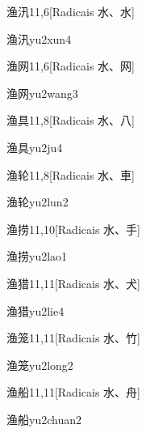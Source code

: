 \begin{entry}{渔汛}{11,6}[Radicais ⽔、⽔]
  \begin{phonetics}{渔汛}{yu2xun4}
  \end{phonetics}
\end{entry}

\begin{entry}{渔网}{11,6}[Radicais ⽔、⽹]
  \begin{phonetics}{渔网}{yu2wang3}
  \end{phonetics}
\end{entry}

\begin{entry}{渔具}{11,8}[Radicais ⽔、⼋]
  \begin{phonetics}{渔具}{yu2ju4}
  \end{phonetics}
\end{entry}

\begin{entry}{渔轮}{11,8}[Radicais ⽔、⾞]
  \begin{phonetics}{渔轮}{yu2lun2}
  \end{phonetics}
\end{entry}

\begin{entry}{渔捞}{11,10}[Radicais ⽔、⼿]
  \begin{phonetics}{渔捞}{yu2lao1}
  \end{phonetics}
\end{entry}

\begin{entry}{渔猎}{11,11}[Radicais ⽔、⽝]
  \begin{phonetics}{渔猎}{yu2lie4}
  \end{phonetics}
\end{entry}

\begin{entry}{渔笼}{11,11}[Radicais ⽔、⽵]
  \begin{phonetics}{渔笼}{yu2long2}
  \end{phonetics}
\end{entry}

\begin{entry}{渔船}{11,11}[Radicais ⽔、⾈]
  \begin{phonetics}{渔船}{yu2chuan2}
  \end{phonetics}
\end{entry}

